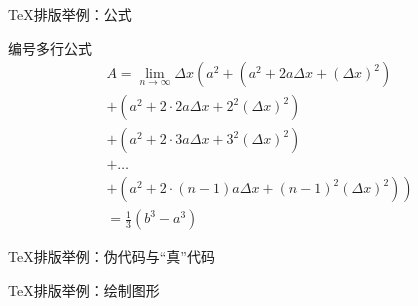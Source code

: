 \begin{frame}{\TeX{}排版举例：公式}
  \begin{exampleblock}{编号多行公式}
    \begin{multline}
    A=\lim_{n\rightarrow\infty}\Delta x\left(a^{2}+\left(a^{2}+2a\Delta x+\left(\Delta x\right)^{2}\right)\right.\label{eq:reset}\\
    +\left(a^{2}+2\cdot2a\Delta x+2^{2}\left(\Delta x\right)^{2}\right)\\
    +\left(a^{2}+2\cdot3a\Delta x+3^{2}\left(\Delta x\right)^{2}\right)\\
    +\ldots\\
    \left.+\left(a^{2}+2\cdot(n-1)a\Delta x+(n-1)^{2}\left(\Delta x\right)^{2}\right)\right)\\
    =\frac{1}{3}\left(b^{3}-a^{3}\right)
  \end{multline}
\end{exampleblock}
\end{frame}

\begin{frame}{\TeX{}排版举例：伪代码与``真''代码}
  \begin{minipage}[c]{0.4\linewidth}
    \tiny
  \end{minipage}\hspace*{0.05\linewidth}
  \begin{minipage}[c]{0.45\linewidth}
    
  \end{minipage}
\end{frame}

\begin{frame}{\TeX{}排版举例：绘制图形}
  \begin{minipage}[c]{0.45\linewidth}
    
  \end{minipage}\hfil
  \begin{minipage}[c]{0.45\linewidth}
    \centering
    
  \end{minipage}
  \pause
  \vspace*{-0.05\paperheight}
  
  \vspace*{-0.05\paperheight}
  \begin{center}
  \end{center}
\end{frame}
